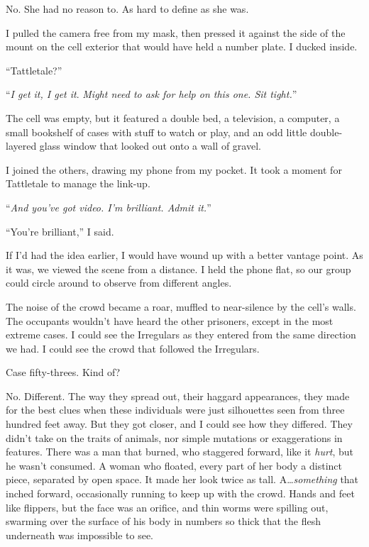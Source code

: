 No.  She had no reason to.  As hard to define as she was.



I pulled the camera free from my mask, then pressed it against the side of the mount on the cell exterior that would have held a number plate.  I ducked inside.



``Tattletale?''



``\emph{I get it, I get it}.  \emph{Might need to ask for help on this one.  Sit tight.}''



The cell was empty, but it featured a double bed, a television, a computer, a small bookshelf of cases with stuff to watch or play, and an odd little double-layered glass window that looked out onto a wall of gravel.



I joined the others, drawing my phone from my pocket.  It took a moment for Tattletale to manage the link-up.



``\emph{And you've got video.  I'm brilliant.  Admit it.}''



``You're brilliant,'' I said.



If I'd had the idea earlier, I would have wound up with a better vantage point.  As it was, we viewed the scene from a distance.  I held the phone flat, so our group could circle around to observe from different angles.



The noise of the crowd became a roar, muffled to near-silence by the cell's walls.  The occupants wouldn't have heard the other prisoners, except in the most extreme cases.  I could see the Irregulars as they entered from the same direction we had.  I could see the crowd that followed the Irregulars.



Case fifty-threes.  Kind of?



No.  Different.  The way they spread out, their haggard appearances, they made for the best clues when these individuals were just silhouettes seen from three hundred feet away.  But they got closer, and I could see how they differed.  They didn't take on the traits of animals, nor simple mutations or exaggerations in features.  There was a man that burned, who staggered forward, like it \emph{hurt}, but he wasn't consumed.  A woman who floated, every part of her body a distinct piece, separated by open space.  It made her look twice as tall.  A\ldots \emph{something} that inched forward, occasionally running to keep up with the crowd.  Hands and feet like flippers, but the face was an orifice, and thin worms were spilling out, swarming over the surface of his body in numbers so thick that the flesh underneath was impossible to see.



